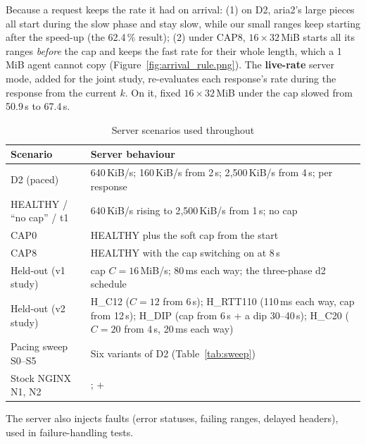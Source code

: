 \begin{keyidea}
Because a request keeps the rate it had on arrival: (1) on D2, aria2's large pieces all start during the slow phase and stay slow, while our small ranges keep starting after the speed-up (the 62.4\,\% result); (2) under CAP8, $16\times32$\,MiB starts all its ranges \emph{before} the cap and keeps the fast rate for their whole length, which a 1\,MiB agent cannot copy (Figure~\ref{fig:arrival_rule.png}). The \textbf{live-rate} server mode, added for the joint study, re-evaluates each response's rate during the response from the current $k$. On it, fixed $16\times32$\,MiB under the cap slowed from 50.9\,s to 67.4\,s.
\end{keyidea}

\begin{table}[H]\centering\small
\caption{Server scenarios used throughout}\label{tab:scenarios}
\begin{tabularx}{\linewidth}{@{}P{3.4cm}L@{}}
\toprule
\textbf{Scenario} & \textbf{Server behaviour}\\
\midrule
D2 (paced) & 640\,KiB/s; 160\,KiB/s from 2\,s; 2{,}500\,KiB/s from 4\,s; per response\\
HEALTHY / ``no cap'' / t1 & 640\,KiB/s rising to 2{,}500\,KiB/s from 1\,s; no cap\\
CAP0 & HEALTHY plus the soft cap from the start\\
CAP8 & HEALTHY with the cap switching on at 8\,s\\
Held-out (v1 study) & cap $C=16$\,MiB/s; 80\,ms each way; the three-phase d2 schedule\\
Held-out (v2 study) & H\_C12 ($C=12$ from 6\,s); H\_RTT110 (110\,ms each way, cap from 12\,s); H\_DIP (cap from 6\,s + a dip 30--40\,s); H\_C20 ($C=20$ from 4\,s, 20\,ms each way)\\
Pacing sweep S0--S5 & Six variants of D2 (Table~\ref{tab:sweep})\\
Stock NGINX N1, N2 & ;  + \\
\bottomrule
\end{tabularx}
\end{table}

The server also injects faults (error statuses, failing ranges, delayed headers), used in failure-handling tests.

